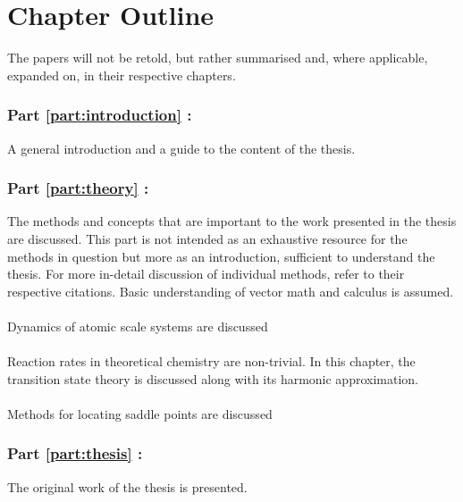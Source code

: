 \section{Chapter Outline}
\label{sec:chapters}

The papers will not be retold, but rather summarised and, where applicable, expanded on, in their respective chapters.

\subsubsection{Part \ref{part:introduction} : }
A general introduction and a guide to the content of the thesis.

\subsubsection{Part \ref{part:theory} : }
The methods and concepts that are important to the work presented in the thesis are discussed.
This part is not intended as an exhaustive resource for the methods in question but more as an introduction, sufficient to understand the thesis.
For more in-detail discussion of individual methods, refer to their respective citations.
Basic understanding of vector math and calculus is assumed.

\paragraph{}
Dynamics of atomic scale systems are discussed \expand

\paragraph{}
Reaction rates in theoretical chemistry are non-trivial.
In this chapter, the transition state theory is discussed along with its harmonic approximation.
\expand

\paragraph{}
Methods for locating saddle points are discussed \expand

\subsubsection{Part \ref{part:thesis} : }
The original work of the thesis is presented.

